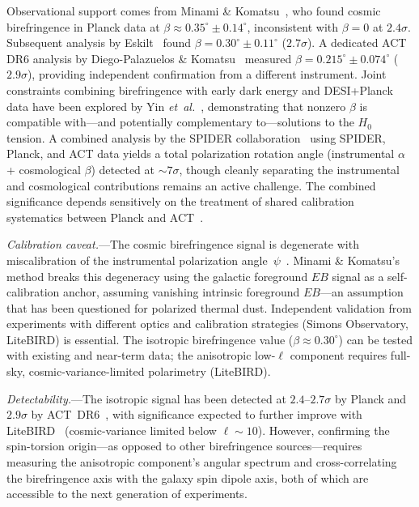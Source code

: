 \documentclass[aps,prd,twocolumn,superscriptaddress,showpacs,preprintnumbers,nofootinbib,longbibliography,floatfix]{revtex4-2}
\newcommand{\etal}{\textit{et~al.}}
\begin{document}
Observational support comes from Minami \& Komatsu~\cite{Minami2020}, who found cosmic birefringence in Planck data at $\beta\approx 0.35^\circ\pm 0.14^\circ$, inconsistent with $\beta=0$ at $2.4\sigma$. Subsequent analysis by Eskilt~\cite{Eskilt2022} found $\beta = 0.30^\circ \pm 0.11^\circ$ ($2.7\sigma$). A dedicated ACT DR6 analysis by Diego-Palazuelos \& Komatsu~\cite{DiegoPalazuelos2025} measured $\beta = 0.215^\circ \pm 0.074^\circ$ ($2.9\sigma$), providing independent confirmation from a different instrument. Joint constraints combining birefringence with early dark energy and DESI+Planck data have been explored by Yin \etal~\cite{Yin2026}, demonstrating that nonzero $\beta$ is compatible with---and potentially complementary to---solutions to the $H_0$ tension. A combined analysis by the SPIDER collaboration~\cite{SPIDER2025} using SPIDER, Planck, and ACT data yields a total polarization rotation angle (instrumental $\alpha$ + cosmological $\beta$) detected at ${\sim}7\sigma$, though cleanly separating the instrumental and cosmological contributions remains an active challenge. The combined significance depends sensitively on the treatment of shared calibration systematics between Planck and ACT~\cite{ACT2024}.

\textit{Calibration caveat.}---The cosmic birefringence signal is degenerate with miscalibration of the instrumental polarization angle~$\psi$~\cite{Minami2020}. Minami \& Komatsu's method breaks this degeneracy using the galactic foreground $EB$ signal as a self-calibration anchor, assuming vanishing intrinsic foreground $EB$---an assumption that has been questioned for polarized thermal dust. Independent validation from experiments with different optics and calibration strategies (Simons Observatory, LiteBIRD) is essential. The isotropic birefringence value ($\beta\approx 0.30^\circ$) can be tested with existing and near-term data; the anisotropic low-$\ell$ component requires full-sky, cosmic-variance-limited polarimetry (LiteBIRD).

\textit{Detectability.}---The isotropic signal has been detected at $2.4$--$2.7\sigma$ by Planck and $2.9\sigma$ by ACT~DR6~\cite{DiegoPalazuelos2025}, with significance expected to further improve with LiteBIRD~\cite{LiteBIRD2023} (cosmic-variance limited below $\ell\sim 10$). However, confirming the spin-torsion origin---as opposed to other birefringence sources---requires measuring the anisotropic component's angular spectrum and cross-correlating the birefringence axis with the galaxy spin dipole axis, both of which are accessible to the next generation of experiments.
\end{document}
